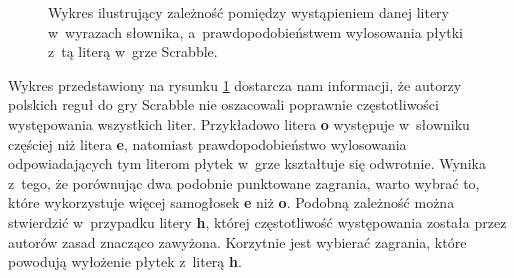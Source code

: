 \documentclass[a4paper,twocolumn,12pt]{article}
\theoremstyle{definition}
\begin{document}
\begin{figure}[ht!]
\begin{center}
		\caption{Wykres ilustrujący zależność pomiędzy wystąpieniem danej litery w~wyrazach słownika, a~prawdopodobieństwem wylosowania płytki z~tą literą w~grze Scrabble.}
		\label{fig:letter_probability_distribution}
	\end{center}
\end{figure}

Wykres przedstawiony na rysunku \ref{fig:letter_probability_distribution} dostarcza nam informacji, że autorzy polskich reguł do gry Scrabble nie oszacowali poprawnie częstotliwości występowania wszystkich liter. Przykładowo litera \textbf{o} występuje w~słowniku częściej niż litera \textbf{e}, natomiast prawdopodobieństwo wylosowania odpowiadających tym literom płytek w~grze kształtuje się odwrotnie. Wynika z~tego, że porównując dwa podobnie punktowane zagrania, warto wybrać to, które wykorzystuje więcej samogłosek \textbf{e} niż \textbf{o}. Podobną zależność można stwierdzić w~przypadku litery \textbf{h}, której częstotliwość występowania została przez autorów zasad znacząco zawyżona. Korzytnie jest wybierać zagrania, które powodują wyłożenie płytek z~literą \textbf{h}.
\end{document}

